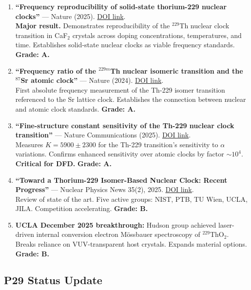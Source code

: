 \documentclass[11pt,a4paper]{article}
\begin{document}
\begin{enumerate}
\item \textbf{``Frequency reproducibility of solid-state thorium-229 nuclear clocks''} --- Nature (2025). \href{https://www.nature.com/articles/s41586-025-09999-5}{DOI link}.\\
\textbf{Major result.} Demonstrates reproducibility of the $^{229}$Th nuclear clock transition in CaF$_2$ crystals across doping concentrations, temperatures, and time. Establishes solid-state nuclear clocks as viable frequency standards. \textbf{Grade: A.}

\item \textbf{``Frequency ratio of the $^{229m}$Th nuclear isomeric transition and the $^{87}$Sr atomic clock''} --- Nature (2024). \href{https://www.nature.com/articles/s41586-024-07839-6}{DOI link}.\\
First absolute frequency measurement of the Th-229 isomer transition referenced to the Sr lattice clock. Establishes the connection between nuclear and atomic clock standards. \textbf{Grade: A.}

\item \textbf{``Fine-structure constant sensitivity of the Th-229 nuclear clock transition''} --- Nature Communications (2025). \href{https://www.nature.com/articles/s41467-025-64191-7}{DOI link}.\\
Measures $K = 5900 \pm 2300$ for the Th-229 transition's sensitivity to $\alpha$ variations. Confirms enhanced sensitivity over atomic clocks by factor $\sim 10^4$. \textbf{Critical for DFD.} \textbf{Grade: A.}

\item \textbf{``Toward a Thorium-229 Isomer-Based Nuclear Clock: Recent Progress''} --- Nuclear Physics News 35(2), 2025. \href{https://www.tandfonline.com/doi/full/10.1080/10619127.2025.2483617}{DOI link}.\\
Review of state of the art. Five active groups: NIST, PTB, TU Wien, UCLA, JILA. Competition accelerating. \textbf{Grade: B.}

\item \textbf{UCLA December 2025 breakthrough:} Hudson group achieved laser-driven internal conversion electron M\"{o}ssbauer spectroscopy of $^{229}$ThO$_2$. Breaks reliance on VUV-transparent host crystals. Expands material options. \textbf{Grade: B.}
\end{enumerate}

\subsection{P29 Status Update}
\end{document}
